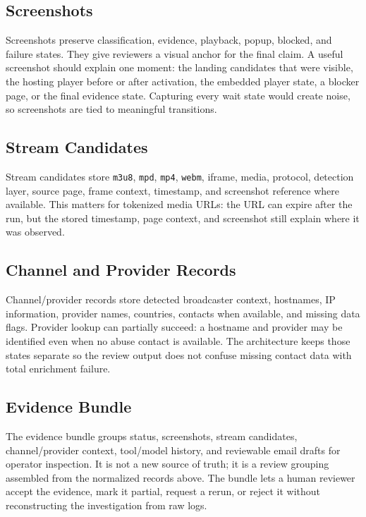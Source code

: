 \subsection{Screenshots}

Screenshots preserve classification, evidence, playback, popup, blocked, and
failure states. They give reviewers a visual anchor for the final claim. A
useful screenshot should explain one moment: the landing candidates that were
visible, the hosting player before or after activation, the embedded player
state, a blocker page, or the final evidence state. Capturing every wait state
would create noise, so screenshots are tied to meaningful transitions.

\subsection{Stream Candidates}

Stream candidates store \texttt{m3u8}, \texttt{mpd}, \texttt{mp4},
\texttt{webm}, iframe, media, protocol, detection layer, source page, frame
context, timestamp, and screenshot reference where available. This matters for
tokenized media URLs: the URL can expire after the run, but the stored
timestamp, page context, and screenshot still explain where it was observed.

\subsection{Channel and Provider Records}

Channel/provider records store detected broadcaster context, hostnames, IP
information, provider names, countries, contacts when available, and missing
data flags. Provider lookup can partially succeed: a hostname and provider may
be identified even when no abuse contact is available. The architecture keeps
those states separate so the review output does not confuse missing contact
data with total enrichment failure.

\subsection{Evidence Bundle}

The evidence bundle groups status, screenshots, stream candidates,
channel/provider context, tool/model history, and reviewable email drafts for
operator inspection. It is not a new source of truth; it is a review grouping
assembled from the normalized records above. The bundle lets a human reviewer
accept the evidence, mark it partial, request a rerun, or reject it without
reconstructing the investigation from raw logs.

